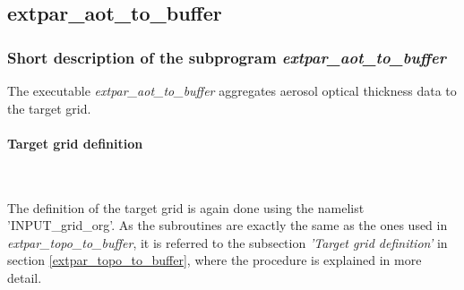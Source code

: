 \documentclass[a4paper,10pt,DIV14,BCOR1cm,titlepage,twoside]{scrartcl}
\begin{document}
\subsection{extpar\_aot\_to\_buffer}\label{extpar_aot_to_buffer}
\subsubsection{Short description of the subprogram \textit{extpar\_aot\_to\_buffer}}
The executable \textit{extpar\_aot\_to\_buffer} aggregates aerosol optical thickness data to the target grid.\par\medskip\noindent
\paragraph{Target grid definition} \ \par\medskip\noindent
The definition of the target grid is again done using the namelist 'INPUT\_grid\_org'. As the subroutines are exactly the same as the ones used in \textit{extpar\_topo\_to\_buffer}, it is referred to the subsection \textit{'Target grid definition'} in section \ref{extpar_topo_to_buffer}, where the procedure is explained in more detail. \par\medskip\noindent
\end{document}
